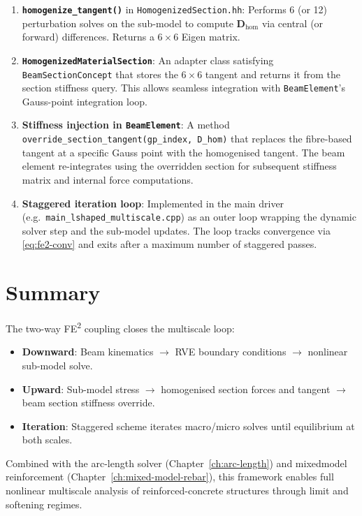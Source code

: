 \begin{enumerate}
  \item \textbf{\texttt{homogenize\_tangent()}} in
    \texttt{HomogenizedSection.hh}: Performs 6 (or 12) perturbation
    solves on the sub-model to compute $\mathbf{D}_{\text{hom}}$
    via central (or forward) differences.  Returns a
    $6 \times 6$ Eigen matrix.

  \item \textbf{\texttt{HomogenizedMaterialSection}}: An adapter class
    satisfying \texttt{BeamSectionConcept} that stores the $6 \times 6$
    tangent and returns it from the section stiffness query.  This
    allows seamless integration with \texttt{BeamElement}'s Gauss-point
    integration loop.

  \item \textbf{Stiffness injection in \texttt{BeamElement}}: A method
    \texttt{override\_section\_tangent(gp\_index, D\_hom)} that replaces
    the fibre-based tangent at a specific Gauss point with the
    homogenised tangent.  The beam element re-integrates using the
    overridden section for subsequent stiffness matrix and internal
    force computations.

  \item \textbf{Staggered iteration loop}: Implemented in the main
    driver (e.g.\ \texttt{main\_lshaped\_multiscale.cpp}) as an outer
    loop wrapping the dynamic solver step and the sub-model updates.
    The loop tracks convergence via \eqref{eq:fe2-conv} and exits
    after a maximum number of staggered passes.
\end{enumerate}


\section{Summary}
\label{sec:fe2-summary}

The two-way FE\textsuperscript{2} coupling closes the multiscale loop:
\begin{itemize}
  \item \textbf{Downward}: Beam kinematics $\to$ RVE boundary
    conditions $\to$ nonlinear sub-model solve.
  \item \textbf{Upward}: Sub-model stress $\to$ homogenised section
    forces and tangent $\to$ beam section stiffness override.
  \item \textbf{Iteration}: Staggered scheme iterates macro/micro
    solves until equilibrium at both scales.
\end{itemize}

Combined with the arc-length solver (Chapter~\ref{ch:arc-length}) and
mixedmodel reinforcement (Chapter~\ref{ch:mixed-model-rebar}), this
framework enables full nonlinear multiscale analysis of
reinforced-concrete structures through limit and softening regimes.
